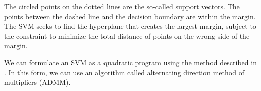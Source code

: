 \documentclass[justified,nobib]{tufte-handout}
\begin{document}
\begin{fullwidth}

The circled points on the dotted lines are the so-called support vectors. The points between the dashed line and the decision boundary are within the margin. The SVM seeks to find the hyperplane that creates the largest margin, subject to the constraint to minimize the total distance of points on the wrong side of the margin.

We can formulate an SVM as a quadratic program using the method described in \citep{stat}. In this form, we can use an algorithm called alternating direction method of multipliers (ADMM). 
%
%
%

\end{fullwidth}
\end{document}
